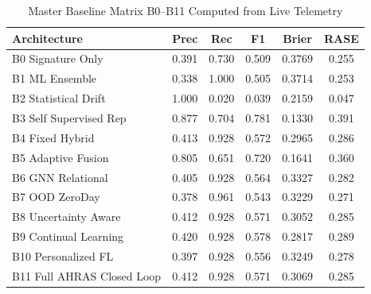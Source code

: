 \begin{table}[t]
\centering
\small
\caption{Master Baseline Matrix B0--B11 Computed from Live Telemetry}
\label{tab:baselines}
\begin{tabular}{lccccc}
\toprule
\textbf{Architecture} & \textbf{Prec} & \textbf{Rec} & \textbf{F1} & \textbf{Brier} & \textbf{RASE} \\
\midrule
B0 Signature Only & 0.391 & 0.730 & 0.509 & 0.3769 & 0.255 \\
B1 ML Ensemble & 0.338 & 1.000 & 0.505 & 0.3714 & 0.253 \\
B2 Statistical Drift & 1.000 & 0.020 & 0.039 & 0.2159 & 0.047 \\
B3 Self Supervised Rep & 0.877 & 0.704 & 0.781 & 0.1330 & 0.391 \\
B4 Fixed Hybrid & 0.413 & 0.928 & 0.572 & 0.2965 & 0.286 \\
B5 Adaptive Fusion & 0.805 & 0.651 & 0.720 & 0.1641 & 0.360 \\
B6 GNN Relational & 0.405 & 0.928 & 0.564 & 0.3327 & 0.282 \\
B7 OOD ZeroDay & 0.378 & 0.961 & 0.543 & 0.3229 & 0.271 \\
B8 Uncertainty Aware & 0.412 & 0.928 & 0.571 & 0.3052 & 0.285 \\
B9 Continual Learning & 0.420 & 0.928 & 0.578 & 0.2817 & 0.289 \\
B10 Personalized FL & 0.397 & 0.928 & 0.556 & 0.3249 & 0.278 \\
B11 Full AHRAS Closed Loop & 0.412 & 0.928 & 0.571 & 0.3069 & 0.285 \\
\bottomrule
\end{tabular}
\end{table}